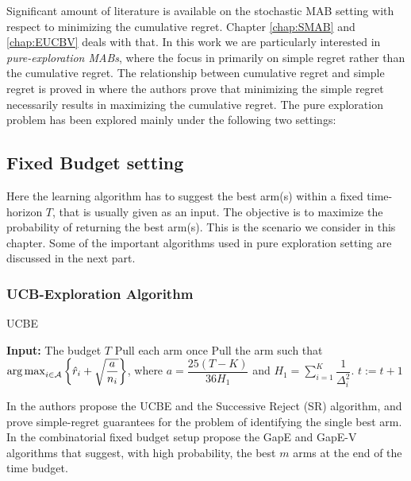 Significant amount of literature is available on the stochastic MAB setting with respect to minimizing the cumulative regret. Chapter \ref{chap:SMAB} and \ref{chap:EUCBV} deals with that. In this work we are particularly interested in \emph{pure-exploration MABs},  where the focus in primarily on simple regret rather than the cumulative regret. The relationship between cumulative regret and simple regret is proved in \citet{bubeck2011pure} where the authors prove that minimizing the simple regret necessarily results in maximizing the cumulative regret.
The pure exploration problem has been explored  mainly under the following two settings:
	
\subsection{Fixed Budget setting} 

Here the learning algorithm has to suggest the best arm(s) within a fixed time-horizon $T$, that is usually given as an input. The objective is to maximize the probability of returning the best arm(s).  This is the scenario we consider in this chapter. Some of the important algorithms used in pure exploration setting are discussed in the next part.

\subsubsection{UCB-Exploration Algorithm}

\begin{algorithm}[!h]
\caption{UCBE}
\label{alg:ucbe}
\begin{algorithmic}[1]
\State \textbf{Input: } The budget $T$
\State Pull each arm once
\State Pull the arm such that $\operatorname*{arg\,max}_{i\in \mathcal{A}}\bigg\lbrace\hat{r}_{i} + \sqrt{\dfrac{a}{n_i}}\bigg\rbrace$, where $a = \dfrac{25(T-K)}{36 H_1}$ and $H_1 = \sum_{i=1}^{K}\dfrac{1}{\Delta_i^2}$.
\State $t:=t+1 $
\EndFor
\end{algorithmic}
\end{algorithm}

In \citet{audibert2010best} the authors propose the  UCBE and the Successive Reject (SR) algorithm, and prove simple-regret guarantees for the problem of identifying the single best arm.  In the combinatorial fixed budget setup \citet{gabillon2011multi} propose the GapE and GapE-V algorithms that suggest, with high probability, the best $m$ arms at the end of the time budget. 


